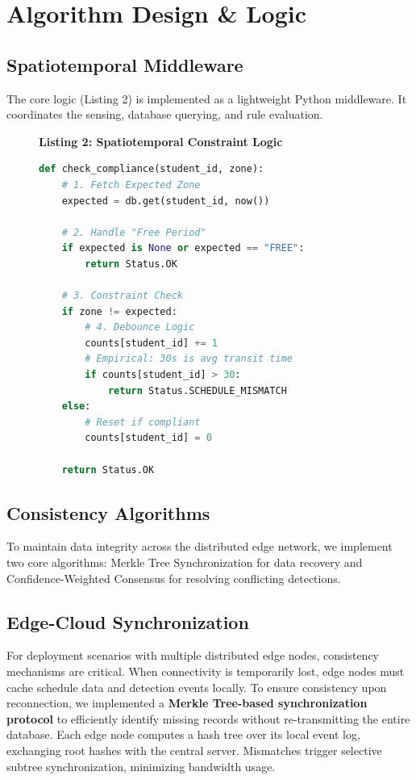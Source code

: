 \documentclass[conference]{IEEEtran}
\begin{document}
\section{Algorithm Design \& Logic}

\subsection{Spatiotemporal Middleware}
The core logic (Listing 2) is implemented as a lightweight Python middleware. It coordinates the sensing, database querying, and rule evaluation.

\begin{figure}[H]
\centering
\textbf{Listing 2: Spatiotemporal Constraint Logic}
\begin{lstlisting}[language=Python]
def check_compliance(student_id, zone):
    # 1. Fetch Expected Zone
    expected = db.get(student_id, now())
      
    # 2. Handle "Free Period"
    if expected is None or expected == "FREE":
        return Status.OK
        
    # 3. Constraint Check
    if zone != expected:
        # 4. Debounce Logic
        counts[student_id] += 1
        # Empirical: 30s is avg transit time
        if counts[student_id] > 30:
            return Status.SCHEDULE_MISMATCH
    else:
        # Reset if compliant
        counts[student_id] = 0
        
    return Status.OK
\end{lstlisting}
\label{code:python}
\end{figure}

\subsection{Consistency Algorithms}
To maintain data integrity across the distributed edge network, we implement two core algorithms: Merkle Tree Synchronization for data recovery and Confidence-Weighted Consensus for resolving conflicting detections.

\subsection{Edge-Cloud Synchronization}
For deployment scenarios with multiple distributed edge nodes, consistency mechanisms are critical. When connectivity is temporarily lost, edge nodes must cache schedule data and detection events locally. To ensure consistency upon reconnection, we implemented a \textbf{Merkle Tree-based synchronization protocol} to efficiently identify missing records without re-transmitting the entire database. Each edge node computes a hash tree over its local event log, exchanging root hashes with the central server. Mismatches trigger selective subtree synchronization, minimizing bandwidth usage.
\end{document}
